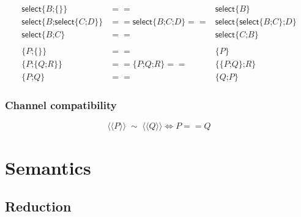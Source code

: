 \begin{eqnarray}
  \textsf{select}\textsf{\{} B \textsf{;} \textsf{\{}\textsf{\}} \textsf{\}} & == & \textsf{select}\textsf{\{} B \textsf{\}} \\
  \textsf{select}\textsf{\{} B \textsf{;} \textsf{select}\textsf{\{} C \textsf{;} D \textsf{\}}\textsf{\}} & == \textsf{select}\textsf{\{} B \textsf{;} C \textsf{;} D \textsf{\}} == & \textsf{select}\textsf{\{} \textsf{select}\textsf{\{} B \textsf{;} C \textsf{\}}\textsf{;} D \textsf{\}} \\
  \textsf{select}\textsf{\{} B \textsf{;} C \textsf{\}} & == & \textsf{select}\textsf{\{} C \textsf{;} B \textsf{\}} \\
%
\mbox{ } \\
  \textsf{\{} P \textsf{;} \textsf{\{} \textsf{\}} \textsf{\}} & == & \textsf{\{} P \textsf{\}} \\
  \textsf{\{} P \textsf{;} \textsf{\{} Q \textsf{;} R \textsf{\}} \textsf{\}} & == \textsf{\{} P \textsf{;} Q \textsf{;} R \textsf{\}} == & \textsf{\{} \textsf{\{} P \textsf{;} Q \textsf{\}}\textsf{;} R \textsf{\}} \\
  \textsf{\{} P \textsf{;} Q \textsf{\}} & == & \textsf{\{} Q \textsf{;} P \textsf{\}}
\end{eqnarray}

\subsubsection{Channel compatibility}


\begin{equation}
  \langle\langle P \rangle\rangle \; \sim \; \langle\langle Q \rangle\rangle \iff P == Q
\end{equation}

\section{Semantics}

\subsection{Reduction}




